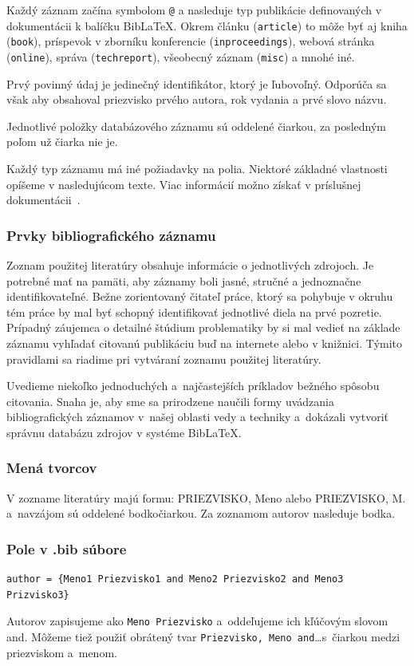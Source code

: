 Každý záznam začína symbolom \verb|@| a nasleduje typ publikácie definovaných v dokumentácii k balíčku Bib\LaTeX.
Okrem článku (\verb|article|) to môže byť aj kniha (\verb|book|),
príspevok v zborníku konferencie (\verb|inproceedings|),
webová stránka (\verb|online|),
správa (\verb|techreport|),
všeobecný záznam (\verb|misc|) a mnohé iné.

Prvý povinný údaj je jedinečný identifikátor, ktorý je ľubovoľný.
Odporúča sa však aby obsahoval priezvisko prvého autora, rok vydania a prvé slovo názvu.

Jednotlivé položky databázového záznamu sú oddelené čiarkou,
za posledným poľom už čiarka nie je.

Každý typ záznamu má iné požiadavky na polia.
Niektoré základné vlastnosti opíšeme v nasledujúcom texte.
Viac informácií možno získať v príslušnej dokumentácii~\cite{Hoftich2022iso690}.

\subsubsection{Prvky bibliografického záznamu}
Zoznam použitej literatúry obsahuje informácie o jednotlivých zdrojoch. Je potrebné mať na pamäti, aby záznamy boli jasné, stručné a jednoznačne identifikovateľné. Bežne zorientovaný čitateľ práce, ktorý sa pohybuje v okruhu tém práce by mal byť schopný identifikovať jednotlivé diela na prvé pozretie. Prípadný záujemca o detailné štúdium problematiky by si mal vedieť na základe záznamu vyhľadať citovanú publikáciu buď na internete alebo v knižnici. Týmito pravidlami sa riadime pri vytváraní zoznamu použitej literatúry.

Uvedieme niekoľko jednoduchých a~najčastejších príkladov bežného
spôsobu citovania.
Snaha je, aby sme sa prirodzene naučili formy uvádzania
bibliografických záznamov v~našej oblasti vedy a techniky
a~dokázali vytvoriť správnu databázu zdrojov v systéme Bib\LaTeX.

\subsubsection*{Mená tvorcov}
V zozname literatúry majú formu: PRIEZVISKO, Meno alebo PRIEZVISKO, M. a~navzájom sú oddelené bodkočiarkou.
Za zoznamom autorov nasleduje bodka.

\subsubsection*{\normalsize Pole v .bib súbore}
\begin{verbatim}
author = {Meno1 Priezvisko1 and Meno2 Priezvisko2 and Meno3 Prizvisko3}
\end{verbatim}
Autorov zapisujeme ako \verb|Meno Priezvisko| a~oddeľujeme ich kľúčovým slovom and.
Môžeme tiež použiť obrátený tvar \verb|Priezvisko, Meno and|\dots s~čiarkou medzi priezviskom a~menom.


